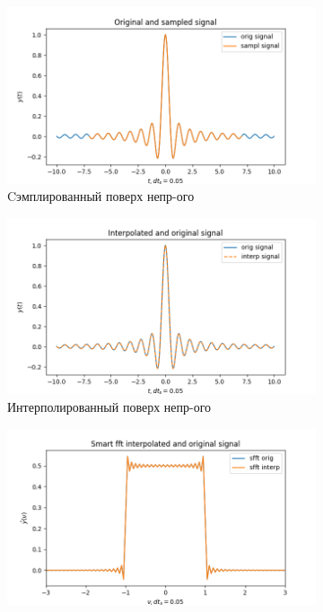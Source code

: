 \documentclass[a4paper, 12pt]{article}
\begin{document}
    \begin{figure}[H]
        \centering
        \begin{subfigure}{0.45\textwidth}
            \centering
            \includegraphics[width=\linewidth]{3_sinc.png}
            \caption{Cэмплированный поверх непр-ого}
            \label{fig:sinc3}
        \end{subfigure}
        \hspace{5mm}
        \begin{subfigure}{0.45\textwidth}
            \centering
            \includegraphics[width=\linewidth]{3_isinc.png}
            \caption{Интерполированный поверх непр-ого}
            \label{fig:isinc3}
        \end{subfigure}
        \begin{subfigure}{0.45\textwidth}
            \centering
            \includegraphics[width=\linewidth]{3_fsinc.png}

\end{subfigure}
\end{figure}
\end{document}
